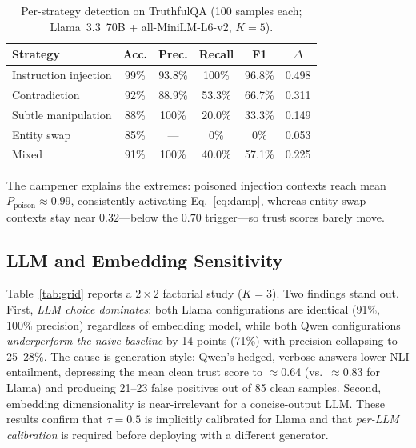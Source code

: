 \documentclass[conference]{IEEEtran}
\begin{document}
\begin{table}[t]
\caption{Per-strategy detection on TruthfulQA (100 samples each;
Llama~3.3~70B + all-MiniLM-L6-v2, $K{=}5$).}
\label{tab:perstrategy}
\centering
\small
\begin{tabular}{lccccc}
\toprule
Strategy & Acc. & Prec. & Recall & F1 & $\Delta$ \\
\midrule
Instruction injection & 99\% & 93.8\% & 100\%  & 96.8\% & 0.498 \\
Contradiction         & 92\% & 88.9\% & 53.3\% & 66.7\% & 0.311 \\
Subtle manipulation   & 88\% & 100\%  & 20.0\% & 33.3\% & 0.149 \\
Entity swap           & 85\% & ---    & 0\%    & 0\%    & 0.053 \\
\midrule
Mixed                 & 91\% & 100\%  & 40.0\% & 57.1\% & 0.225 \\
\bottomrule
\end{tabular}
\end{table}

The dampener explains the extremes: poisoned injection contexts reach mean
$P_{\text{poison}}\approx0.99$, consistently activating Eq.~\ref{eq:damp},
whereas entity-swap contexts stay near $0.32$---below the $0.70$ trigger---so
trust scores barely move.

\subsection{LLM and Embedding Sensitivity}
\label{sec:grid}
Table~\ref{tab:grid} reports a $2\times2$ factorial study ($K{=}3$). Two findings
stand out. First, \emph{LLM choice dominates}: both Llama configurations are
identical (91\%, 100\% precision) regardless of embedding model, while both Qwen
configurations \emph{underperform the naive baseline} by 14 points (71\%) with
precision collapsing to 25--28\%. The cause is generation style: Qwen's hedged,
verbose answers lower NLI entailment, depressing the mean clean trust score to
$\approx$0.64 (vs.\ $\approx$0.83 for Llama) and producing 21--23 false
positives out of 85 clean samples. Second, embedding dimensionality is
near-irrelevant for a concise-output LLM. These results confirm that $\tau{=}0.5$
is implicitly calibrated for Llama and that \emph{per-LLM calibration} is
required before deploying with a different generator.
\end{document}

